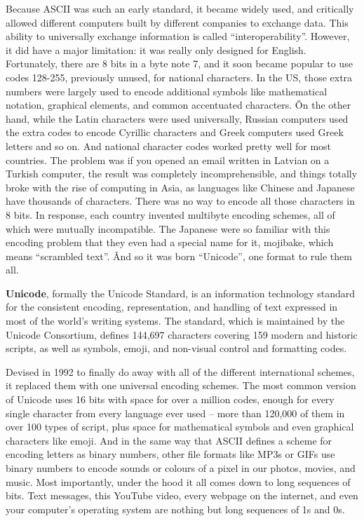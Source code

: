 Because ASCII was such an early standard, it became widely used, and critically allowed different computers built by
different companies to exchange data. This ability to universally exchange information is called ``interoperability''.
However, it did have a major limitation: it was really only designed for English. Fortunately, there are 8 bits in
a byte note 7, and it soon became popular to use codes 128-255, previously unused, for national characters. In the
US, those extra numbers were largely used to encode additional symbols like mathematical notation, graphical
elements, and common accentuated characters. \v

On the other hand, while the Latin characters were used universally, Russian computers used the extra codes to encode
Cyrillic characters and Greek computers used Greek letters and so on. And national character codes worked pretty well
for most countries. The problem was if you opened an email written in Latvian on a Turkish computer, the result was
completely incomprehensible, and things totally broke with the rise of computing in Asia, as languages like Chinese
and Japanese have thousands of characters. There was no way to encode all those characters in 8 bits. In response,
each country invented multibyte encoding schemes, all of which were mutually incompatible. The Japanese were so
familiar with this encoding problem that they even had a special name for it, mojibake, which means ``scrambled
text''. \v

And so it was born ``Unicode'', one format to rule them all.

\bd[Unicode]
\textbf{Unicode}, formally the Unicode Standard, is an information technology standard for the consistent encoding,
representation, and handling of text expressed in most of the world's writing systems. The standard, which is
maintained by the Unicode Consortium, defines 144,697 characters covering 159 modern and historic scripts, as well as
symbols, emoji, and non-visual control and formatting codes.
\ed

Devised in 1992 to finally do away with all of the different international schemes, it replaced them with one
universal encoding schemes. The most common version of Unicode uses 16 bits with space for over a million codes,
enough for every single character from every language ever used – more than 120,000 of them in over 100 types of
script, plus space for mathematical symbols and even graphical characters like emoji. And in the same way that ASCII
defines a scheme for encoding letters as binary numbers, other file formats like MP3s or GIFs use binary numbers to
encode sounds or colours of a pixel in our photos, movies, and music. Most importantly, under the hood it all comes
down to long sequences of bits. Text messages, this YouTube video, every webpage on the internet, and even your
computer's operating system are nothing but long sequences of 1s and 0s.

